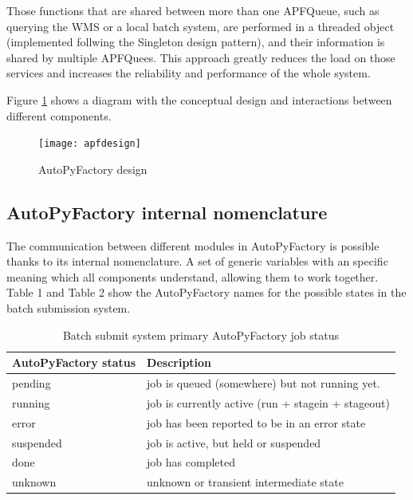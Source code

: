 \documentclass[a4paper]{jpconf}
\begin{document}
Those functions that are shared between more than one APFQueue, such
as querying the WMS or a local batch system,
are performed in a threaded object (implemented follwing the Singleton design
pattern), and their information is shared by multiple APFQuees. This approach
greatly reduces the load on those services and increases the reliability and performance of the whole system.

Figure \ref{apfdesign} shows a diagram with the conceptual design and 
interactions between different components.

\begin{figure}[h]
\centering\texttt{[image: apfdesign]}
\caption{AutoPyFactory design}
\label{apfdesign}
\end{figure}

\subsection{AutoPyFactory internal nomenclature}

The communication between different modules in AutoPyFactory 
is possible thanks to its internal nomenclature.
A set of generic variables with an specific meaning which all components 
understand, allowing them to work together. 
Table 1 and Table 2 show the AutoPyFactory names for the
possible states in the batch submission system. 

\begin{table}[h]
   \begin{center}
      \begin{tabular}{l l}
         \hline
         \textbf{AutoPyFactory status} & \textbf{Description} \\ 
         \hline
         pending      &     job is queued (somewhere) but not running yet.      \\  
         running      &     job is currently active (run + stagein + stageout)  \\ 
         error        &     job has been reported to be in an error state       \\ 
         suspended    &     job is active, but held or suspended                \\ 
         done         &     job has completed                                   \\ 
         unknown      &     unknown or transient intermediate state             \\ 
         \hline
      \end{tabular}
   \end{center}
   \caption{Batch submit system primary AutoPyFactory job status}
   \label{job secondary status}
\end{table}
\end{document}
